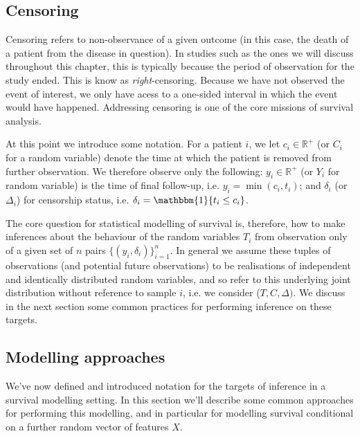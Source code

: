 \documentclass[../thesis.tex]{subfiles}
\begin{document}
\subsection{Censoring}
Censoring refers to non-observance of a given outcome (in this case, the death of a patient from the disease in question). In studies such as the ones we will discuss throughout this chapter, this is typically because the period of observation for the study ended. This is know as \emph{right}-censoring. Because we have not observed the event of interest, we only have acess to a one-sided interval in which the event would have happened. Addressing censoring is one of the core missions of survival analysis.

At this point we introduce some notation. For a patient $i$, we let $c_i \in \mathbb{R}^{+}$ (or $C_i$ for a random variable) denote the time at which the patient is removed from further observation. We therefore observe only the following: $y_i \in \mathbb{R}^{+}$ (or $Y_i$ for random variable) is the time of final follow-up, i.e. $y_i = \min(c_i, t_i)$; and $\delta_i$ (or $\Delta_i$) for censorship status, i.e. $\delta_i = \mathbbm{1}\{t_i \leq c_i\}$. 

The core question for statistical modelling of survival is, therefore, how to make inferences about the behaviour of the random variables $T_i$ from observation only of a given set of $n$ pairs $\{(y_i, \delta_i)\}_{i=1}^{n}$. In general we assume these tuples of observations (and potential future observations) to be realisations of independent and identically distributed random variables, and so refer to this underlying joint distribution without reference to sample $i$, i.e. we consider ($T, C, \Delta)$.  We discuss in the next section some common practices for performing inference on these targets.
   
\subsection{Modelling approaches}
We've now defined and introduced notation for the targets of inference in a survival modelling setting. In this section we'll describe some common approaches for performing this modelling, and in particular for modelling survival conditional on a further random vector of features $X$. 
\end{document}
